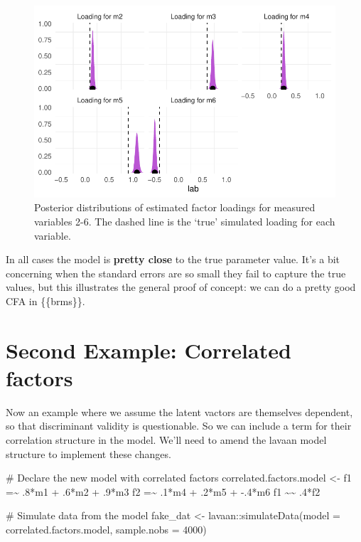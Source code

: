 \documentclass[
  letterpaper,
  DIV=11,
  numbers=noendperiod]{scrreprt}
\newenvironment{Shaded}{\begin{snugshade}}{\end{snugshade}}
\newcommand{\AttributeTok}[1]{\textcolor[rgb]{0.40,0.45,0.13}{#1}}
\newcommand{\CommentTok}[1]{\textcolor[rgb]{0.37,0.37,0.37}{#1}}
\newcommand{\DecValTok}[1]{\textcolor[rgb]{0.68,0.00,0.00}{#1}}
\newcommand{\FunctionTok}[1]{\textcolor[rgb]{0.28,0.35,0.67}{#1}}
\newcommand{\NormalTok}[1]{\textcolor[rgb]{0.00,0.23,0.31}{#1}}
\newcommand{\OtherTok}[1]{\textcolor[rgb]{0.00,0.23,0.31}{#1}}
\newcommand{\SpecialCharTok}[1]{\textcolor[rgb]{0.37,0.37,0.37}{#1}}
\newcommand{\StringTok}[1]{\textcolor[rgb]{0.13,0.47,0.30}{#1}}
\begin{document}
\begin{figure}[H]

{\centering \includegraphics{./bayesian-cfa_files/figure-pdf/viz-draws-1-fac-1.pdf}

}

\caption{Posterior distributions of estimated factor loadings for
measured variables 2-6. The dashed line is the `true' simulated loading
for each variable.}

\end{figure}

In all cases the model is \textbf{pretty close} to the true parameter
value. It's a bit concerning when the standard errors are so small they
fail to capture the true values, but this illustrates the general proof
of concept: we can do a pretty good CFA in \{\{brms\}\}.

\hypertarget{second-example-correlated-factors}{%
\section{Second Example: Correlated
factors}\label{second-example-correlated-factors}}

Now an example where we assume the latent vactors are themselves
dependent, so that discriminant validity is questionable. So we can
include a term for their correlation structure in the model. We'll need
to amend the lavaan model structure to implement these changes.

\begin{Shaded}
\begin{Highlighting}[]
\CommentTok{\# Declare the new model with correlated factors}
\NormalTok{correlated.factors.model }\OtherTok{\textless{}{-}} \StringTok{\textquotesingle{} }
\StringTok{  f1 =\textasciitilde{} .8*m1 + .6*m2 + .9*m3}
\StringTok{  f2 =\textasciitilde{} .1*m4 + .2*m5 + {-}.4*m6}
\StringTok{  f1 \textasciitilde{}\textasciitilde{} .4*f2}
\StringTok{\textquotesingle{}}

\CommentTok{\# Simulate data from the model}
\NormalTok{fake\_dat }\OtherTok{\textless{}{-}}\NormalTok{ lavaan}\SpecialCharTok{::}\FunctionTok{simulateData}\NormalTok{(}\AttributeTok{model =}\NormalTok{ correlated.factors.model, }\AttributeTok{sample.nobs =} \DecValTok{4000}\NormalTok{)}
\end{Highlighting}
\end{Shaded}
\end{document}
